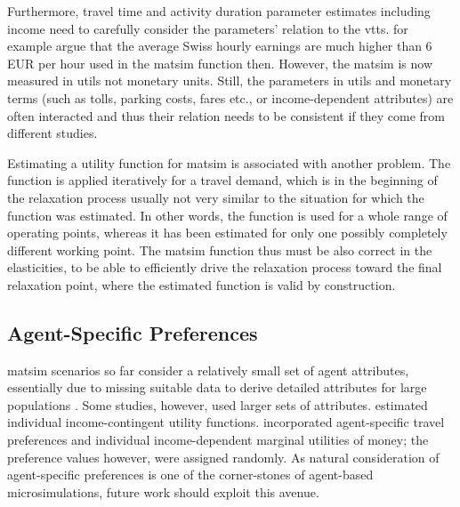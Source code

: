 Furthermore, travel time and activity duration parameter estimates including income need to carefully consider the parameters' relation to the \gls{vtts}. \citet[][p.276]{MeisterEtAl_SVT_2009} for example argue that the average Swiss hourly earnings are much higher than 6\,EUR per hour used in the \gls{matsim} function then. 
However, the \gls{matsim} is now measured in utils not monetary units. 
Still, the parameters in utils and monetary terms (such as tolls, parking costs, fares etc., or income-dependent attributes) are often interacted and thus their relation needs to be consistent if they come from different studies.
%
 


Estimating a utility function for \gls{matsim} is associated with another problem. 
The function is applied iteratively for a travel demand, which is in the beginning of the relaxation process usually not very similar to the situation for which the function was estimated. 
In other words, the function is used for a whole range of operating points, whereas it has been estimated for only one possibly completely different working point. 
The \gls{matsim} function thus must be also correct in the elasticities, to be able to efficiently drive the relaxation process toward the final relaxation point, where the estimated function is valid by construction. 

\subsection{Agent-Specific Preferences}
\label{sec:agent-specific-prefs}
\gls{matsim} scenarios so far consider a relatively small set of agent attributes, essentially due to missing suitable data to derive detailed attributes for large populations \citep[][]{MuellerFloetteroed_unpub_hEART_2014}. 
Some studies, however, used larger sets of attributes. 
\citet{GretherEtAl2010TrbIncomeInTRR, KickhoeferEtAl2011PolicyEvaluationIncome} estimated individual income-contingent utility functions. 
\citet[][]{HorniEtAl_TechRep_IVT_2012_a, HorniAxhausen_TechRep_IVT_2014} incorporated agent-specific travel preferences and individual income-dependent marginal utilities of money; the preference values however, were assigned randomly. 
As natural consideration of agent-specific preferences is one of the corner-stones of agent-based \glspl{microsimulation}, future work should exploit this avenue. 

